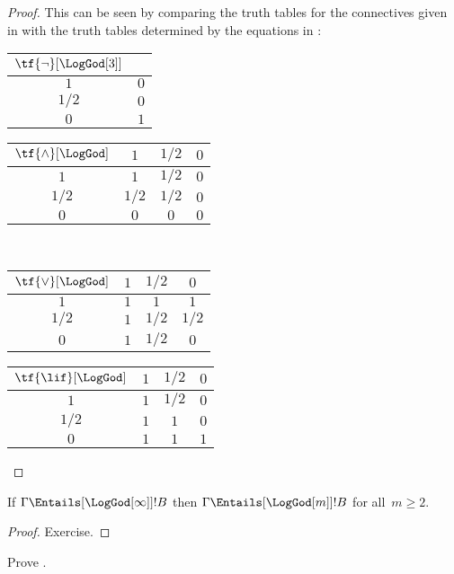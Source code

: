 \documentclass[../../../include/open-logic-section]{subfiles}
\begin{document}
\begin{proof}
  This can be seen by comparing the truth tables for the connectives
  given in  with the truth tables
  determined by the equations in :
  \begin{center}
    \begin{tabular}{c|c} 
      $\tf{\lnot}[\LogGod[3]]$ & \\ 
      \hline  
      $1$ & $0$ \\ 
      $1/2$ & $0$ \\
      $0$ & $1$ 
    \end{tabular}
    \quad
    \begin{tabular}{c|ccc} 
      $\tf{\land}[\LogGod]$ & $1$ & $1/2$ & $0$ \\ 
      \hline 
      $1$ & $1$ & $1/2$ & $0$ \\ 
      $1/2$ & $1/2$ & $1/2$ & $0$\\ 
      $0$ & $0$ & $0$ & $0$ 
    \end{tabular}
    \\[2ex]
    \begin{tabular}{c|ccc} 
      $\tf{\lor}[\LogGod]$ & $1$ & $1/2$ & $0$ \\ 
      \hline 
      $1$ & $1$ & $1$ & $1$ \\ 
      $1/2$ & $1$ & $1/2$ & $1/2$ \\
      $0$ & $1$ & $1/2$ & $0$ 
    \end{tabular}
    \quad
    \begin{tabular}{c|ccc} 
      $\tf{\lif}[\LogGod]$ & $1$ & $1/2$ & $0$ \\ 
      \hline 
      $1$ & $1$ & $1/2$ & $0$ \\ 
      $1/2$ & $1$ & $1$ & $0$  \\ 
      $0$ & $1$ & $1$ & $1$ 
    \end{tabular}
  \end{center} 
\end{proof}

\begin{prop}
  If $\Gamma \Entails[\LogGod[\infty]] !B$ then $\Gamma
  \Entails[\LogGod[m]] !B$ for all~$m \ge 2$.
\end{prop}

\begin{proof}
  Exercise.
\end{proof}

\begin{prob}
  Prove .
\end{prob}
\end{document}

